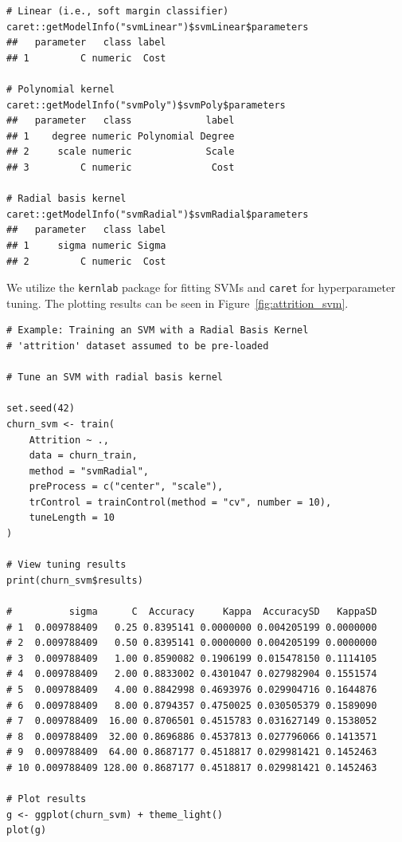 \documentclass{article}
\begin{document}
\begin{listing}[H]
    \begin{verbatim}
# Linear (i.e., soft margin classifier)
caret::getModelInfo("svmLinear")$svmLinear$parameters
##   parameter   class label
## 1         C numeric  Cost

# Polynomial kernel
caret::getModelInfo("svmPoly")$svmPoly$parameters
##   parameter   class             label
## 1    degree numeric Polynomial Degree
## 2     scale numeric             Scale
## 3         C numeric              Cost

# Radial basis kernel
caret::getModelInfo("svmRadial")$svmRadial$parameters
##   parameter   class label
## 1     sigma numeric Sigma
## 2         C numeric  Cost
    \end{verbatim}
    \caption{Hyperparameter Discovery: Identifying tunable parameters (e.g., $C$, $degree$, and $\sigma$) for Linear, Polynomial, and RBF kernels.}
\end{listing}

We utilize the \texttt{kernlab} package for fitting SVMs and \texttt{caret} for hyperparameter tuning.  The plotting results can be seen in Figure~\ref{fig:attrition_svm}.

\begin{listing}[H]
    \begin{verbatim}
# Example: Training an SVM with a Radial Basis Kernel
# 'attrition' dataset assumed to be pre-loaded

# Tune an SVM with radial basis kernel

set.seed(42)
churn_svm <- train(
    Attrition ~ .,
    data = churn_train,
    method = "svmRadial",
    preProcess = c("center", "scale"),
    trControl = trainControl(method = "cv", number = 10),
    tuneLength = 10
)

# View tuning results
print(churn_svm$results)

#          sigma      C  Accuracy     Kappa  AccuracySD   KappaSD
# 1  0.009788409   0.25 0.8395141 0.0000000 0.004205199 0.0000000
# 2  0.009788409   0.50 0.8395141 0.0000000 0.004205199 0.0000000
# 3  0.009788409   1.00 0.8590082 0.1906199 0.015478150 0.1114105
# 4  0.009788409   2.00 0.8833002 0.4301047 0.027982904 0.1551574
# 5  0.009788409   4.00 0.8842998 0.4693976 0.029904716 0.1644876
# 6  0.009788409   8.00 0.8794357 0.4750025 0.030505379 0.1589090
# 7  0.009788409  16.00 0.8706501 0.4515783 0.031627149 0.1538052
# 8  0.009788409  32.00 0.8696886 0.4537813 0.027796066 0.1413571
# 9  0.009788409  64.00 0.8687177 0.4518817 0.029981421 0.1452463
# 10 0.009788409 128.00 0.8687177 0.4518817 0.029981421 0.1452463

# Plot results
g <- ggplot(churn_svm) + theme_light()
plot(g)
    \end{verbatim}
    \caption{SVM Implementation: Training a Radial Basis Function (RBF) model with 10-fold cross-validation and hyperparameter optimization.}\end{listing}
\end{document}
